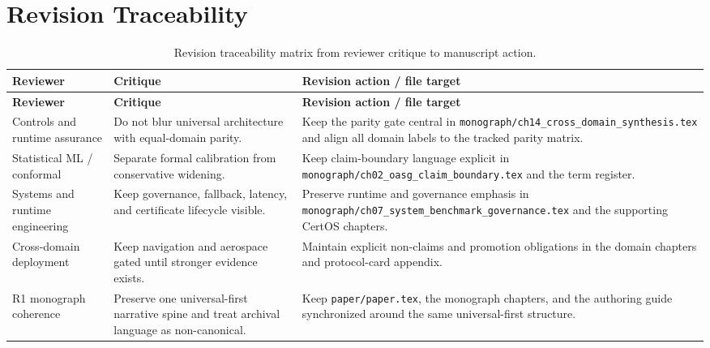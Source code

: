 \section{Revision Traceability}
\begin{longtable}{p{}p{}p{}}
\caption{Revision traceability matrix from reviewer critique to manuscript action.}\label{tab:reviewer-traceability}\\
\toprule
\textbf{Reviewer} & \textbf{Critique} & \textbf{Revision action / file target}\\
\midrule
\endfirsthead
\toprule
\textbf{Reviewer} & \textbf{Critique} & \textbf{Revision action / file target}\\
\midrule
\endhead
Controls and runtime assurance & Do not blur universal architecture with equal-domain parity. & Keep the parity gate central in \texttt{monograph/ch14\_cross\_domain\_synthesis.tex} and align all domain labels to the tracked parity matrix.\\
Statistical ML / conformal & Separate formal calibration from conservative widening. & Keep claim-boundary language explicit in \texttt{monograph/ch02\_oasg\_claim\_boundary.tex} and the term register.\\
Systems and runtime engineering & Keep governance, fallback, latency, and certificate lifecycle visible. & Preserve runtime and governance emphasis in \texttt{monograph/ch07\_system\_benchmark\_governance.tex} and the supporting CertOS chapters.\\
Cross-domain deployment & Keep navigation and aerospace gated until stronger evidence exists. & Maintain explicit non-claims and promotion obligations in the domain chapters and protocol-card appendix.\\
R1 monograph coherence & Preserve one universal-first narrative spine and treat archival language as non-canonical. & Keep \texttt{paper/paper.tex}, the monograph chapters, and the authoring guide synchronized around the same universal-first structure.\\
\bottomrule
\end{longtable}

